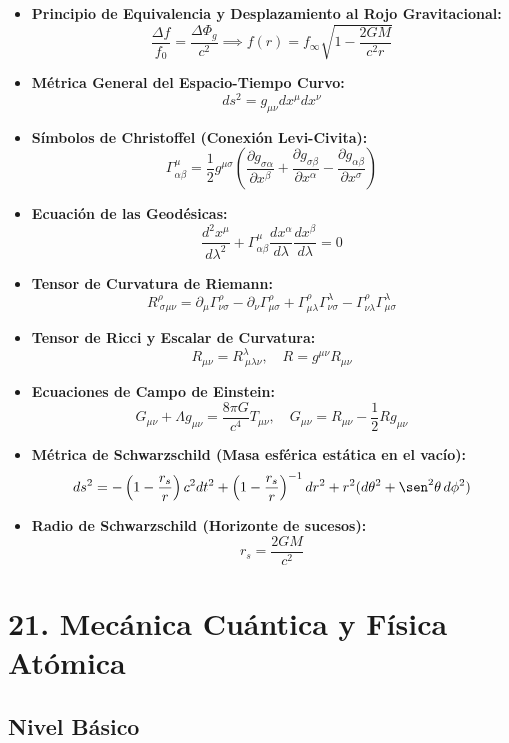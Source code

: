 \documentclass[11pt,a4paper]{article}
\begin{document}
\begin{itemize}
  \item \textbf{Principio de Equivalencia y Desplazamiento al Rojo Gravitacional:}
  \[
    \frac{\Delta f}{f_0} = \frac{\Delta\Phi_g}{c^2} \implies f(r) = f_\infty \sqrt{1 - \frac{2GM}{c^2 r}}
  \]
  \item \textbf{Métrica General del Espacio-Tiempo Curvo:}
  \[
    ds^2 = g_{\mu\nu} dx^\mu dx^\nu
  \]
  \item \textbf{Símbolos de Christoffel (Conexión Levi-Civita):}
  \[
    \Gamma^\mu_{\alpha\beta} = \frac{1}{2} g^{\mu\sigma} \left( \frac{\partial g_{\sigma\alpha}}{\partial x^\beta} + \frac{\partial g_{\sigma\beta}}{\partial x^\alpha} - \frac{\partial g_{\alpha\beta}}{\partial x^\sigma} \right)
  \]
  \item \textbf{Ecuación de las Geodésicas:}
  \[
    \frac{d^2 x^\mu}{d\lambda^2} + \Gamma^\mu_{\alpha\beta} \frac{dx^\alpha}{d\lambda} \frac{dx^\beta}{d\lambda} = 0
  \]
  \item \textbf{Tensor de Curvatura de Riemann:}
  \[
    R^\rho_{\ \sigma\mu\nu} = \partial_\mu \Gamma^\rho_{\nu\sigma} - \partial_\nu \Gamma^\rho_{\mu\sigma} + \Gamma^\rho_{\mu\lambda} \Gamma^\lambda_{\nu\sigma} - \Gamma^\rho_{\nu\lambda} \Gamma^\lambda_{\mu\sigma}
  \]
  \item \textbf{Tensor de Ricci y Escalar de Curvatura:}
  \[
    R_{\mu\nu} = R^\lambda_{\ \mu\lambda\nu}, \quad R = g^{\mu\nu} R_{\mu\nu}
  \]
  \item \textbf{Ecuaciones de Campo de Einstein:}
  \[
    G_{\mu\nu} + \Lambda g_{\mu\nu} = \frac{8\pi G}{c^4} T_{\mu\nu}, \quad G_{\mu\nu} = R_{\mu\nu} - \frac{1}{2} R g_{\mu\nu}
  \]
  \item \textbf{Métrica de Schwarzschild (Masa esférica estática en el vacío):}
  \[
    ds^2 = -\left( 1 - \frac{r_s}{r} \right) c^2 dt^2 + \left( 1 - \frac{r_s}{r} \right)^{-1} dr^2 + r^2 (d\theta^2 + \sen^2\theta \, d\phi^2)
  \]
  \item \textbf{Radio de Schwarzschild (Horizonte de sucesos):}
  \[
    r_s = \frac{2GM}{c^2}
  \]
\end{itemize}

\section*{21. Mecánica Cuántica y Física Atómica}

\subsection*{Nivel Básico}
\end{document}
